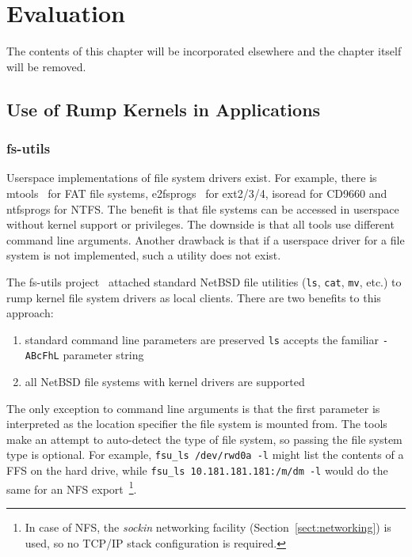 
\section{Evaluation}
\label{chap:evaluation}

The contents of this chapter will be incorporated elsewhere and the
chapter itself will be removed.


\subsection{Use of Rump Kernels in Applications}

\subsubsection{fs-utils}
\label{sect:fs-utils}

Userspace implementations of file system drivers
exist.  For example, there is mtools~\cite{mtools} for FAT
file systems, e2fsprogs~\cite{e2fsprogs} for ext2/3/4, isoread for
CD9660 and ntfsprogs for NTFS.  The benefit is that file systems
can be accessed in userspace without kernel support or privileges.
The downside is that all tools use different command line arguments.
Another drawback is that if a userspace driver for a file system
is not implemented, such a utility does not exist.

The fs-utils project~\cite{ysmal:fs-utils} attached standard NetBSD
file utilities (\texttt{ls}, \texttt{cat}, \texttt{mv}, etc.) to rump
kernel file system drivers as local clients.  There are two benefits
to this approach:

\begin{enumerate}
\item standard command line parameters are preserved \ie \texttt{ls}
accepts the familiar \texttt{-ABcFhL} parameter string

\item all NetBSD file systems with kernel drivers are supported
\end{enumerate}

The only exception to command line arguments is that the first parameter
is interpreted as the location specifier the file system is mounted from.
The tools make an attempt to auto-detect the type of file system, so passing the file system
type is optional.  For example, \verb+fsu_ls /dev/rwd0a -l+ might list
the contents of
a FFS on the hard drive, while \verb+fsu_ls 10.181.181.181:/m/dm -l+
would do the same for an NFS
export~\footnote
{
	In case of NFS, the \textit{sockin} networking facility
	(Section~\ref{sect:networking}) is used, so no TCP/IP stack
	configuration is required.
}.

